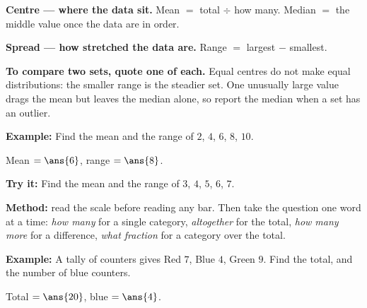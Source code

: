 \documentclass[12pt]{article}
\begin{document}


\begin{formulabox}
\textbf{Centre --- where the data sit.} Mean $=$ total $\div$ how many. Median $=$ the
middle value once the data are in order.
\par\smallskip
\textbf{Spread --- how stretched the data are.} Range $=$ largest $-$ smallest.
\par\smallskip
\textbf{To compare two sets, quote one of each.} Equal centres do not make equal
distributions: the smaller range is the steadier set. One unusually large value drags the
mean but leaves the median alone, so report the median when a set has an outlier.
\end{formulabox}

\begin{examplebox}
\textbf{Example:} \quad Find the mean and the range of $2$, $4$, $6$, $8$, $10$.

Mean $= \ans{6}$, \quad range $= \ans{8}$.
\end{examplebox}

\begin{tryitbox}
\textbf{Try it:} \quad Find the mean and the range of $3$, $4$, $5$, $6$, $7$.\\[2pt]
\end{tryitbox}


\begin{formulabox}
\textbf{Method:} read the scale before reading any bar. Then take the question one word at
a time: \emph{how many} for a single category, \emph{altogether} for the total,
\emph{how many more} for a difference, \emph{what fraction} for a category over the total.
\end{formulabox}

\begin{examplebox}
\textbf{Example:} \quad A tally of counters gives Red $7$, Blue $4$, Green $9$. Find the
total, and the number of blue counters.

Total $= \ans{20}$, \quad blue $= \ans{4}$.
\end{examplebox}
\end{document}
